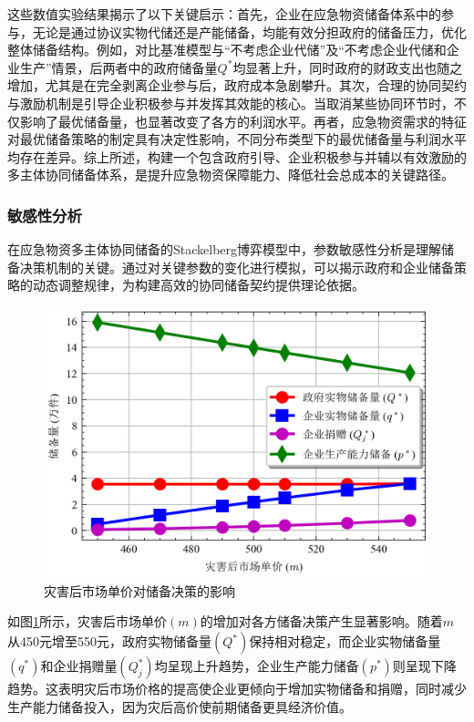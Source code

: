 \documentclass[a4paper,8pt,twocolumn]{article} %
\begin{document}
这些数值实验结果揭示了以下关键启示：首先，企业在应急物资储备体系中的参与，无论是通过协议实物代储还是产能储备，均能有效分担政府的储备压力，优化整体储备结构。例如，对比基准模型与“不考虑企业代储”及“不考虑企业代储和企业生产”情景，后两者中的政府储备量$Q^*$均显著上升，同时政府的财政支出也随之增加，尤其是在完全剥离企业参与后，政府成本急剧攀升。其次，合理的协同契约与激励机制是引导企业积极参与并发挥其效能的核心。当取消某些协同环节时，不仅影响了最优储备量，也显著改变了各方的利润水平。再者，应急物资需求的特征对最优储备策略的制定具有决定性影响，不同分布类型下的最优储备量与利润水平均存在差异。综上所述，构建一个包含政府引导、企业积极参与并辅以有效激励的多主体协同储备体系，是提升应急物资保障能力、降低社会总成本的关键路径。
\subsubsection{敏感性分析}
在应急物资多主体协同储备的Stackelberg博弈模型中，参数敏感性分析是理解储备决策机制的关键。通过对关键参数的变化进行模拟，可以揭示政府和企业储备策略的动态调整规律，为构建高效的协同储备契约提供理论依据。
\begin{figure}[H]
\centering
\includegraphics[width=\linewidth]{basic_pictures/sensitivity_m.png}
\caption{灾害后市场单价对储备决策的影响}
\label{fig:sensitivity_m}
\end{figure}
如图\ref{fig:sensitivity_m}所示，灾害后市场单价$(m)$的增加对各方储备决策产生显著影响。随着$m$从450元增至550元，政府实物储备量$(Q^*)$保持相对稳定，而企业实物储备量$(q^*)$和企业捐赠量$(Q_j^*)$均呈现上升趋势，企业生产能力储备$(p^*)$则呈现下降趋势。这表明灾后市场价格的提高使企业更倾向于增加实物储备和捐赠，同时减少生产能力储备投入，因为灾后高价使前期储备更具经济价值。
\end{document}
